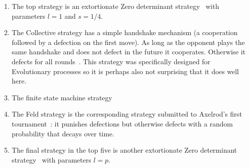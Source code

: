 \documentclass{article}
\begin{document}
\begin{enumerate}
    \item The top strategy is an extortionate Zero determinant
        strategy~\cite{Press2012} with parameters \(l=1\) and \(s=1/4\).
    \item The Collective strategy has a simple handshake mechanism (a
        cooperation followed by a defection on the first move). As long as the
        opponent plays the same handshake and does not defect in the future it
        cooperates. Otherwise it defects for all rounds~\cite{Li2009}.  This
        strategy was specifically designed for Evolutionary processes so it is
        perhaps also not surprising that it does well here.
    \item The finite state machine strategy %
    \item The Feld strategy is the corresponding strategy submitted to Axelrod's
        first tournament~\cite{Axelrod1980a}: it punishes defections but
        otherwise defects with a random probability that decays over time.
    \item The final strategy in the top five is another extortionate Zero
        determinant strategy~\cite{Press2012} with parameters \(l=p\).
\end{enumerate}
\end{document}
